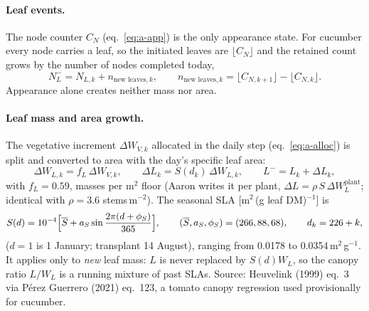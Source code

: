 \documentclass[11pt,a4paper]{article}
\begin{document}
\paragraph{Leaf events.} The node counter $C_N$ (eq.~\eqref{eq:a-app}) is the only appearance state. For cucumber every
node carries a leaf, so the initiated leaves are $\lfloor C_N\rfloor$ and the retained count grows by the number of
nodes completed today,
\begin{equation}
N_L^-=N_{L,k}+n_{\text{new leaves},k},\qquad n_{\text{new leaves},k}=\lfloor C_{N,k+1}\rfloor-\lfloor C_{N,k}\rfloor .
\end{equation}
Appearance alone creates neither mass nor area.

\paragraph{Leaf mass and area growth.} The vegetative increment $\Delta W_{V,k}$ allocated in the daily step
(eq.~\eqref{eq:a-alloc}) is split and converted to area with the day's specific leaf area:
\begin{equation}\label{eq:lai-growth}
\Delta W_{L,k}=f_L\,\Delta W_{V,k},\qquad
\Delta L_k=S(d_k)\,\Delta W_{L,k},\qquad
L^-=L_k+\Delta L_k ,
\end{equation}
with $f_L=0.59$, masses per m$^2$ floor (Aaron writes it per plant, $\Delta L=\rho\,S\,\Delta W_L^{\text{plant}}$;
identical with $\rho=3.6$ stems\,m$^{-2}$). The seasonal SLA [m$^2$\,(g leaf DM)$^{-1}$] is
\begin{equation}\label{eq:sla}
S(d)=10^{-4}\Bigl[\overline S+a_S\sin\frac{2\pi(d+\phi_S)}{365}\Bigr],\qquad (\overline S,a_S,\phi_S)=(266,88,68),
\qquad d_k=226+k ,
\end{equation}
($d=1$ is 1 January; transplant 14 August), ranging from 0.0178 to 0.0354\,m$^2$\,g$^{-1}$. It applies only to
\emph{new} leaf mass: $L$ is never replaced by $S(d)W_L$, so the canopy ratio $L/W_L$ is a running mixture of
past SLAs. Source: Heuvelink (1999) eq.~3 via P\'erez Guerrero (2021) eq.~123, a tomato canopy regression used
provisionally for cucumber.
\end{document}
